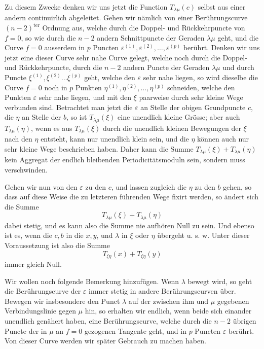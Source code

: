 \documentclass[10pt]{article}
\begin{document}
Zu diesem Zwecke denken wir uns jetzt die Function \(T_{\lambda\mu}(c)\) selbst aus einer andern continuirlich abgeleitet. Gehen wir nämlich von einer Berührungscurve \((n-2)^{\mathrm{ter}}\) Ordnung aus, welche durch die Doppel- und Rückkehrpuncte von \(f=0\), so wie durch die \(n-2\) andern Schnittpuncte der Geraden \(\lambda\mu\) geht, und die Curve \(f=0\) ausserdem in \(p\) Puncten \(\varepsilon^{(1)},\varepsilon^{(2)},\ldots,\varepsilon^{(p)}\) berührt. Denken wir uns jetzt eine dieser Curve sehr nahe Curve gelegt, welche noch durch die Doppel- und Rückkehrpuncte, durch die \(n-2\) andern Puncte der Geraden \(\lambda\mu\) und durch Puncte \(\xi^{(1)},\xi^{(2)}\ldots\xi^{(p)}\) geht, welche den \(\varepsilon\) sehr nahe liegen, so wird dieselbe die Curve \(f=0\) noch in \(p\) Punkten \(\eta^{(1)},\eta^{(2)},\ldots,\eta^{(p)}\) schneiden, welche den Punkten \(\varepsilon\) sehr nahe liegen, und mit den \(\xi\) paarweise durch sehr kleine Wege verbunden sind. Betrachtet man jetzt die \(\varepsilon\) an Stelle der obigen Grundpuncte \(c\), die \(\eta\) an Stelle der \(b\), so ist \(T_{\lambda\mu}(\xi)\) eine unendlich kleine Grösse; aber auch \(T_{\lambda\mu}(\eta)\), wenn es aus \(T_{\lambda\mu}(\xi)\) durch die unendlich kleinen Bewegungen der \(\xi\) nach den \(\eta\) entsteht, kann nur unendlich klein sein, und die \(\eta\) können auch nur sehr kleine Wege beschrieben haben. Daher kann die Summe \(T_{\lambda\mu}(\xi)+T_{\lambda\mu}(\eta)\) kein Aggregat der endlich bleibenden Periodicitätsmoduln sein, sondern muss verschwinden.

Gehen wir nun von den \(\varepsilon\) zu den \(c\), und lassen zugleich die \(\eta\) zu den \(b\) gehen, so dass auf diese Weise die zu letzteren führenden Wege fixirt werden, so ändert sich die Summe
\[
T_{\lambda\mu}(\xi)+T_{\lambda\mu}(\eta)
\]
dabei stetig, und es kann also die Summe nie aufhören Null zu sein. Und ebenso ist es, wenn die \(c,b\) in die \(x,y\), und \(\lambda\) in \(\xi\) oder \(\eta\) übergeht u. s. w. Unter dieser Voraussetzung ist also die Summe
\[
T_{\xi\eta}(x)+T_{\xi\eta}(y)
\]
immer gleich Null.

Wir wollen noch folgende Bemerkung hinzufügen. Wenn \(\lambda\) bewegt wird, so geht die Berührungscurve der \(\varepsilon\) immer stetig in andere Berührungscurven über. Bewegen wir insbesondere den Punct \(\lambda\) auf der zwischen ihm und \(\mu\) gegebenen Verbindungslinie gegen \(\mu\) hin, so erhalten wir endlich, wenn beide sich einander unendlich genähert haben, eine Berührungscurve, welche durch die \(n-2\) übrigen Puncte der in \(\mu\) an \(f=0\) gezogenen Tangente geht, und in \(p\) Puncten \(\varepsilon\) berührt. Von dieser Curve werden wir später Gebrauch zu machen haben.
\end{document}
